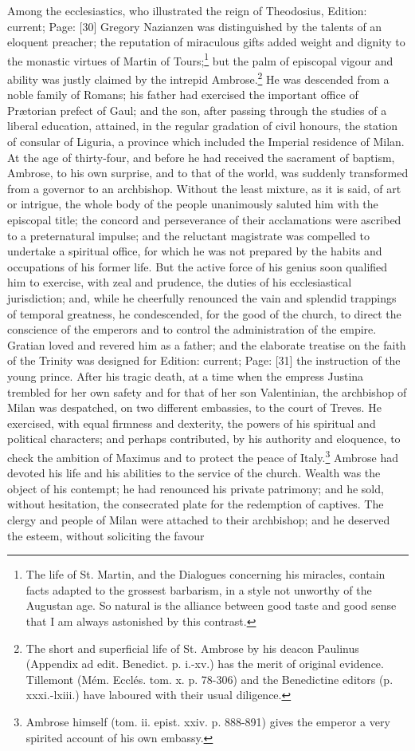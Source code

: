 Among the ecclesiastics, who illustrated the reign of Theodosius, Edition: current; Page: [30] Gregory Nazianzen was distinguished by the talents of an eloquent preacher; the reputation of miraculous gifts added weight and dignity to the monastic virtues of Martin of Tours;\footnote{The life of St. Martin, and the Dialogues concerning his miracles, contain facts adapted to the grossest barbarism, in a style not unworthy of the Augustan age. So natural is the alliance between good taste and good sense that I am always astonished by this contrast.} but the palm of episcopal vigour and ability was justly claimed by the intrepid Ambrose.\footnote{The short and superficial life of St. Ambrose by his deacon Paulinus (Appendix ad edit. Benedict. p. i.-xv.) has the merit of original evidence. Tillemont (Mém. Ecclés. tom. x. p. 78-306) and the Benedictine editors (p. xxxi.-lxiii.) have laboured with their usual diligence.} He was descended from a noble family of Romans; his father had exercised the important office of Prætorian prefect of Gaul; and the son, after passing through the studies of a liberal education, attained, in the regular gradation of civil honours, the station of consular of Liguria, a province which included the Imperial residence of Milan. At the age of thirty-four, and before he had received the sacrament of baptism, Ambrose, to his own surprise, and to that of the world, was suddenly transformed from a governor to an archbishop. Without the least mixture, as it is said, of art or intrigue, the whole body of the people unanimously saluted him with the episcopal title; the concord and perseverance of their acclamations were ascribed to a preternatural impulse; and the reluctant magistrate was compelled to undertake a spiritual office, for which he was not prepared by the habits and occupations of his former life. But the active force of his genius soon qualified him to exercise, with zeal and prudence, the duties of his ecclesiastical jurisdiction; and, while he cheerfully renounced the vain and splendid trappings of temporal greatness, he condescended, for the good of the church, to direct the conscience of the emperors and to control the administration of the empire. Gratian loved and revered him as a father; and the elaborate treatise on the faith of the Trinity was designed for Edition: current; Page: [31] the instruction of the young prince. After his tragic death, at a time when the empress Justina trembled for her own safety and for that of her son Valentinian, the archbishop of Milan was despatched, on two different embassies, to the court of Treves. He exercised, with equal firmness and dexterity, the powers of his spiritual and political characters; and perhaps contributed, by his authority and eloquence, to check the ambition of Maximus and to protect the peace of Italy.\footnote{Ambrose himself (tom. ii. epist. xxiv. p. 888-891) gives the emperor a very spirited account of his own embassy.} Ambrose had devoted his life and his abilities to the service of the church. Wealth was the object of his contempt; he had renounced his private patrimony; and he sold, without hesitation, the consecrated plate for the redemption of captives. The clergy and people of Milan were attached to their archbishop; and he deserved the esteem, without soliciting the favour 